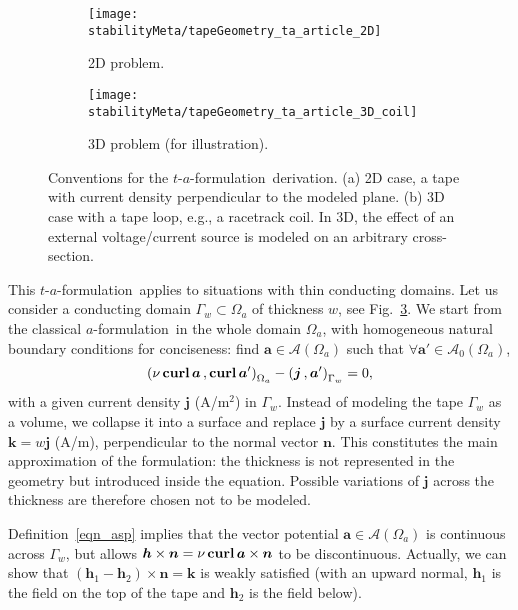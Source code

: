 \documentclass[journal]{IEEEtran}
\renewcommand{\vec}[1]{\boldsymbol{#1}} %
\newcommand{\paren}[1]{\left(#1\right)}
\newcommand{\volInt}[3]{\paren{#1 \, , #2}_{#3}}
\newcommand{\curl}{\text{\textbf{curl}}\, }
\renewcommand{\a}{\vec a}
\newcommand{\n}{\vec n}
\newcommand{\h}{\vec h}
\renewcommand{\j}{\vec j}
\newcommand{\Oa}{\Omega_a}
\newcommand{\af}{$a$-formulation\ }
\newcommand{\taf}{$t$-$a$-formulation\ }
\newcommand{\asp}{\mathcal{A}}
\newcommand{\aspz}{\mathcal{A}_{0}}
\begin{document}
\begin{figure}[h!]
            \begin{subfigure}[b]{0.49\linewidth}
            \centering
		\texttt{[image: stabilityMeta/tapeGeometry\_ta\_article\_2D]}
		\caption{2D problem.}
		\label{tapeGeometry_ta_article_2D}
        \end{subfigure}
\begin{subfigure}[b]{0.49\linewidth}  
            \centering 
		\texttt{[image: stabilityMeta/tapeGeometry\_ta\_article\_3D\_coil]}
		\caption{3D problem (for illustration).}
		\label{tapeGeometry_ta_article_3D}	
      \end{subfigure}
\caption{Conventions for the \taf derivation. (a) 2D case, a tape with current density perpendicular to the modeled plane. (b) 3D case with a tape loop, e.g., a racetrack coil. In 3D, the effect of an external voltage/current source is modeled on an arbitrary cross-section.}
\label{tapeGeometry_ta}
\end{figure}

This \taf applies to situations with thin conducting domains. Let us consider a conducting domain $\Gamma_w\subset \Oa$ of thickness $w$, see Fig.~\ref{tapeGeometry_ta}. We start from the classical \af in the whole domain $\Oa$, with homogeneous natural boundary conditions for conciseness: find $\a\in \asp(\Oa)$ such that $\forall \a' \in \aspz(\Oa)$,
\begin{equation}\label{a_formulation_ta_js}
\volInt{\nu\, \curl \a}{\curl \a'}{\Oa} - \volInt{\j}{\a'}{\Gamma_w} = 0,
\end{equation}
with a given current density $\j$ (A/m$^2$) in $\Gamma_w$. Instead of modeling the tape $\Gamma_w$ as a volume, we collapse it into a surface and replace $\j$ by a surface current density $\vec k = w\j$ (A/m), perpendicular to the normal vector $\n$. This constitutes the main approximation of the formulation: the thickness is not represented in the geometry but introduced inside the equation. Possible variations of $\j$ across the thickness are therefore chosen not to be modeled.

Definition~\eqref{eqn_asp} implies that the vector potential $\a\in \asp(\Oa)$ is continuous across $\Gamma_w$, but allows $\h \times \n = \nu \,\curl\a \times \n$ to be discontinuous. Actually, we can show that $(\h_1-\h_2)\times \vec n = \vec k$ is weakly satisfied (with an upward normal, $\h_1$ is the field on the top of the tape and $\h_2$ is the field below).
\end{document}
